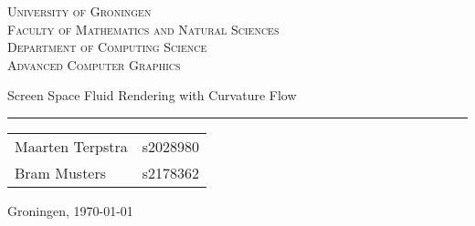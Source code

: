 
\begin{titlepage}

\newcommand{\titleinfo} {Advanced Computer Graphics}
\newcommand{\authorinfo} {Maarten Terpstra - s2028980  \\ Bram Musters - s2178362}

\center
\textsc{\Large University of Groningen} \\[0.2cm]
\textsc{Faculty of Mathematics and Natural Sciences} \\[0.2cm]
\textsc{Department of Computing Science} \\[0.5cm]
\textsc{\large \titleinfo} \\[1.5cm]


\begin{flushleft}
{\LARGE Screen Space Fluid Rendering with Curvature Flow}
{\rule{\linewidth}{0.1mm}}
\end{flushleft}


\begin{flushright}
	\large
	\begin{tabular}{ll}
		Maarten Terpstra & s2028980 \\
		Bram Musters & s2178362 \\
	\end{tabular}
\end{flushright}

\vfill

Groningen, \today\\

\end{titlepage}
